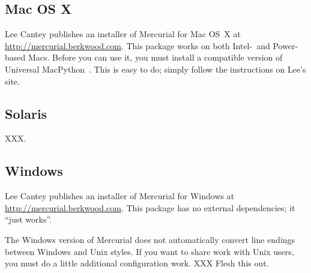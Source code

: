 \subsection{Mac OS X}

Lee Cantey publishes an installer of Mercurial for Mac OS~X at
\url{http://mercurial.berkwood.com}.  This package works on both
Intel-~and Power-based Macs.  Before you can use it, you must install
a compatible version of Universal MacPython~\cite{web:macpython}.  This
is easy to do; simply follow the instructions on Lee's site.

\subsection{Solaris}

XXX.

\subsection{Windows}

Lee Cantey publishes an installer of Mercurial for Windows at
\url{http://mercurial.berkwood.com}.  This package has no external
dependencies; it ``just works''.

\begin{note}
  The Windows version of Mercurial does not automatically convert line
  endings between Windows and Unix styles.  If you want to share work
  with Unix users, you must do a little additional configuration
  work. XXX Flesh this out.
\end{note}


